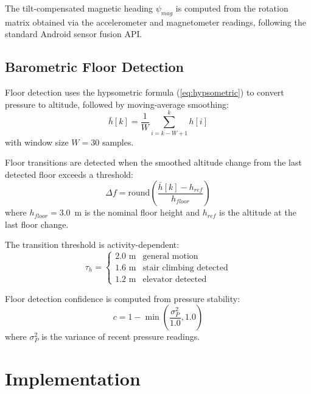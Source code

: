 \documentclass[journal,twocolumn]{IEEEtran}
\begin{document}
The tilt-compensated magnetic heading $\psi_{mag}$ is computed from the rotation matrix obtained via the accelerometer and magnetometer readings, following the standard Android sensor fusion API.

\subsection{Barometric Floor Detection}

Floor detection uses the hypsometric formula (\ref{eq:hypsometric}) to convert pressure to altitude, followed by moving-average smoothing:
\begin{equation}
    \bar{h}[k] = \frac{1}{W} \sum_{i=k-W+1}^{k} h[i]
    \label{eq:moving_avg}
\end{equation}
with window size $W = 30$ samples.

Floor transitions are detected when the smoothed altitude change from the last detected floor exceeds a threshold:
\begin{equation}
    \Delta f = \text{round}\left(\frac{\bar{h}[k] - h_{ref}}{h_{floor}}\right)
    \label{eq:floor_change}
\end{equation}
where $h_{floor} = 3.0$~m is the nominal floor height and $h_{ref}$ is the altitude at the last floor change.

The transition threshold is activity-dependent:
\begin{equation}
    \tau_h = \begin{cases}
    2.0 \text{ m} & \text{general motion} \\
    1.6 \text{ m} & \text{stair climbing detected} \\
    1.2 \text{ m} & \text{elevator detected}
    \end{cases}
    \label{eq:floor_threshold}
\end{equation}

Floor detection confidence is computed from pressure stability:
\begin{equation}
    c = 1 - \min\left(\frac{\sigma_P^2}{1.0}, 1.0\right)
    \label{eq:confidence}
\end{equation}
where $\sigma_P^2$ is the variance of recent pressure readings.

\section{Implementation}
\label{sec:implementation}
\end{document}
